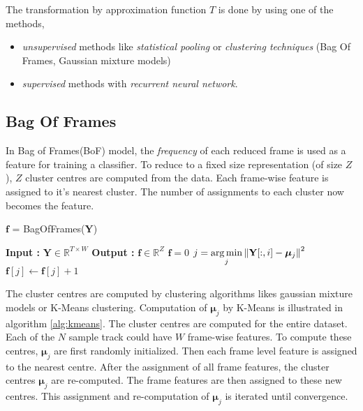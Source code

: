 \noindent The transformation by approximation function $T$ is done by using one of the methods,
\begin{itemize}
\setlength\itemsep{0em}
\item \textit{unsupervised} methods like \textit{statistical pooling} or \textit{clustering techniques} (Bag Of Frames, Gaussian mixture models)
\item \textit{supervised} methods with \textit{recurrent neural network}. 
\end{itemize} 
 
\subsection{Bag Of Frames}
\label{clustering}
In Bag of Frames(BoF) model, the \textit{frequency} of each reduced frame is used as a feature for training a classifier. To reduce to a fixed size representation (of size $Z$), $Z$ cluster centres are computed from the data. Each frame-wise feature is assigned to it's nearest cluster. The number of assignments to each cluster now becomes the feature. 
\begin{algorithm}
  \caption{$\textbf{f}$ = BagOfFrames($\textbf{Y}$) }\label{bof}
  \begin{algorithmic}[1]
    \Statex \textbf{Input :} $\textbf{Y} \in \mathbb{R}^{T \times W}$
    \Statex \textbf{Output :} $\textbf{f} \in \mathbb{R}^{Z}$
    \State $\textbf{f} = 0$
    \State $j = \operatorname*{arg\,min}\limits_{j} \left\lVert\textbf{Y}[:,i] - \bm{\mu}_{j}\right\rVert^{2}$ 
    \State $\textbf{f}[j] \leftarrow \textbf{f}[j] + 1$
    \EndFor
  \end{algorithmic}
\end{algorithm}
\FloatBarrier
\noindent The cluster centres are computed by clustering algorithms likes gaussian mixture models or K-Means clustering. Computation of $\bm{\mu}_{j}$ by K-Means is illustrated in algorithm \ref{alg:kmeans}. The cluster centres are computed for the entire dataset. Each of the $N$ sample track could have $W$ frame-wise features. To compute these centres, $\bm{\mu}_{j}$ are first randomly initialized. Then each frame level feature is assigned to the nearest centre. After the assignment of all frame features, the cluster centres $\bm{\mu}_{j}$ are re-computed. The frame features are then assigned to these new centres. This assignment and re-computation of $\bm{\mu}_{j}$ is iterated until convergence.  
